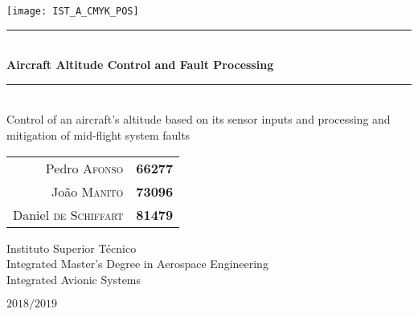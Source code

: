 \documentclass{article}
\begin{document}
\begin{titlepage}

\texttt{[image: IST\_A\_CMYK\_POS]}
	
\begin{center}
	\vspace{40mm} %
	\rule{\linewidth}{0.5pt} \\
    \vspace{2mm}
	{\Huge \textbf{Aircraft Altitude Control and Fault Processing}} \\
	\rule{\linewidth}{2pt} \\
	\vspace{8mm} %
	{\Large Control of an aircraft's altitude based on its sensor inputs and processing and mitigation of mid-flight system faults}
	
	\vspace{\fill} %
	
	\begin{tabular}{r l}
		Pedro \textsc{Afonso} & \textbf{66277} \\
		João \textsc{Manito} & \textbf{73096} \\
		Daniel \textsc{de Schiffart} & \textbf{81479}
	\end{tabular}
	
	\vspace{10mm} %
	{\Large Instituto Superior Técnico} \\
	{\Large Integrated Master's Degree in Aerospace Engineering} \\
	\vspace{1mm}
	{\large Integrated Avionic Systems}
	
	\vspace{10mm} %
	{\Large $2018/2019$}
\end{center}
\end{titlepage}

{\hypersetup{linkcolor = black} \tableofcontents}

\begin{abstract}
	The objective of the second laboratory for this course was to control an aircraft's altitude and movement based on the input provided by its sensors and the transmission of data throughout the aircraft's onboard systems via its Local Area Network, characterizing the data protocols and preparing data for transmission. The second part of this laboratory had its focus more directed to the possibility of mid-flight faults to various aircraft systems, the handling of these faults and the simulation of data to maintain the control of the aircraft's altitude mentioned in the first part in the presence of faults in any of the crucial systems for this process. The work was to be implemented in C code for the major part of its simulations, with an initial theoretical segment being done with the use of \textsc{MATLAB} to obtain fixed results relevant to the work.
\end{abstract}
\end{document}
